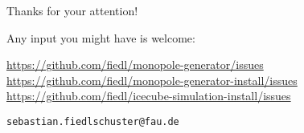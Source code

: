 
\begin{frame}{Thanks for your attention!}
  \begin{center}
    Any input you might have is welcome: \\ \vspace{0.3cm}

    \url{https://github.com/fiedl/monopole-generator/issues} \\ \vspace{0.2cm}
    \url{https://github.com/fiedl/monopole-generator-install/issues} \\ \vspace{0.2cm}
    \url{https://github.com/fiedl/icecube-simulation-install/issues} \\ \vspace{0.5cm}

    \texttt{sebastian.fiedlschuster@fau.de}

    \vspace{1.5cm}

  \end{center}
\end{frame}
